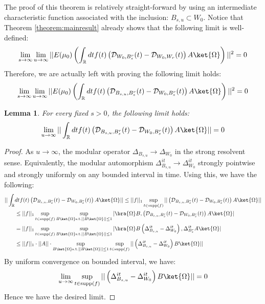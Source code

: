 \documentclass[a4paper,11pt]{article}
\newtheorem{lemma}[theorem]{Lemma}
\theoremstyle{definition}
\theoremstyle{remark}
\newcommand{\lb}{\left(}
\newcommand{\rb}{\right)}
\begin{document}
The proof of this theorem is relatively straight-forward by using an intermediate characteristic function associated with the inclusion: $B_{s,u}\subset W_0$. Notice that Theorem \ref{theorem:mainresult} already shows that the following limit is well-defined:
\begin{equation}
    \lim_{s\rightarrow\infty}\lim_{u\rightarrow\infty}||E(\mu_0)\lb\int_\mathbb{R} dt f(t)\lb \mathcal{D}_{W_0, B^r_s}(t) - \mathcal{D}_{W_0, W_r}(t) \rb A\ket{\Omega}\rb||^2 = 0
\end{equation}
Therefore, we are actually left with proving the following limit holds:
\begin{equation}
    \lim_{s\rightarrow\infty}\lim_{u\rightarrow\infty}||E(\mu_0)\lb\int_\mathbb{R} dt f(t)\lb \mathcal{D}_{B_{s,u}, B^r_s}(t) - \mathcal{D}_{W_0, B^r_s}(t) \rb A\ket{\Omega}\rb||^2 = 0
\end{equation}
\begin{lemma}
    For every fixed $s > 0$, the following limit holds:
    \begin{equation}
        \lim_{u\rightarrow\infty}||\int_\mathbb{R} dt f(t)\lb\mathcal{D}_{B_{s,u}, B^r_s}(t) - \mathcal{D}_{W_0, B^r_s}(t)\rb A\ket{\Omega}|| = 0
    \end{equation}
\end{lemma}
\begin{proof}
    As $u\rightarrow\infty$, the modular operator $\Delta_{B_{s,u}}\rightarrow \Delta_{W_0}$ in the strong resolvent sense\cite{takesaki2}. Equivalently, the modular automorphism $\Delta_{B_{s,u}}^{it}\rightarrow\Delta_{W_0}^{it}$ strongly pointwise and strongly uniformly on any bounded interval in time. Using this, we have the following:
    \begin{align}
        \begin{split}
            ||\int_\mathbb{R}& dt f(t) \lb\mathcal{D}_{B_{s,u},B^r_s}(t) - \mathcal{D}_{W_0, B^r_s}(t)\rb A\ket{\Omega}|| \leq ||f||_1\sup_{t\in\text{supp}(f)}||\lb\mathcal{D}_{B_{s,u},B^r_s}(t) - \mathcal{D}_{W_0, B^r_s}(t)\rb A\ket{\Omega}||
            \\
            &\leq ||f||_1\sup_{t\in\text{supp}(f)}\sup_{B\ket{\Omega}\text{s.t.}||B\ket{\Omega}||\leq 1}|\bra{\Omega}B, \lb\mathcal{D}_{B_{s,u}, B^r_s}(t) - \mathcal{D}_{W_0, B^r_s}(t)\rb A\ket{\Omega}|
            \\&
            =||f||_1\sup_{t\in\text{supp}(f)}\sup_{B\ket{\Omega}\text{s.t.}||B\ket{\Omega}||\leq 1}|\bra{\Omega}B\lb\Delta^{it}_{B_{s,u}}- \Delta^{it}_{W_0}\rb, \Delta^{it}_{B_s^r}A\ket{\Omega}|
            \\&
            \leq||f||_1\cdot||A||\cdot\sup_{B\ket{\Omega}\text{s.t.}||B\ket{\Omega}||\leq 1}\sup_{t\in\text{supp}(f)}||\lb\Delta^{it}_{B_{s,u}} - \Delta^{it}_{W_0}\rb B\ket{\Omega}||
        \end{split}
    \end{align}
    By uniform convergence on bounded interval, we have:
    \begin{equation}
        \lim_{u\rightarrow\infty}\sup_{t\in\text{supp}(f)}||\lb\Delta^{it}_{B_{s,u}} - \Delta^{it}_{W_0}\rb B\ket{\Omega}|| = 0
    \end{equation}
    Hence we have the desired limit.\qedhere
\end{proof}
\end{document}
